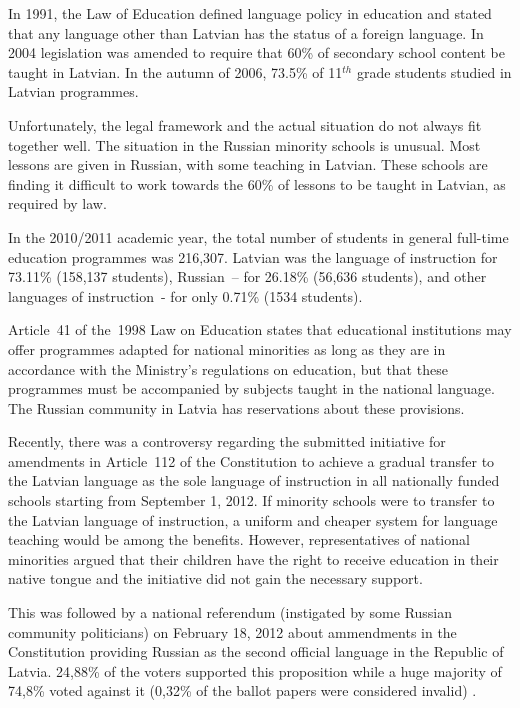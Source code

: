\begin{multicols}{2}
In 1991, the Law of Education defined language policy in education and stated that any language other than Latvian has the status of a foreign language.
In 2004 legislation was amended to require that 60\% of secondary school content be taught in Latvian.
In the autumn of 2006, 73.5\% of 11${}^{th}$ grade students studied in Latvian programmes.

Unfortunately, the legal framework and the actual situation do not always fit together well.
The situation in the Russian minority schools is unusual.
Most lessons are given in Russian, with some teaching in Latvian.
These schools are finding it difficult to work towards the 60\% of lessons to be taught in Latvian, as required by law.


In the 2010/2011 academic year, the total number of students in general full-time education programmes was 216,307.
Latvian was the language of instruction for 73.11\% (158,137 students), Russian~-- for 26.18\% (56,636 students), and other languages of instruction~- for only 0.71\% (1534 students).

Article~41 of the~1998 Law on Education states that educational institutions may offer programmes adapted for national minorities as long as they are in accordance with the Ministry's regulations on education, but that these programmes must be accompanied by subjects taught in the national language.
The Russian community in Latvia has reservations about these provisions.

Recently, there was a controversy regarding the submitted initiative for amendments in Article~112 of the Constitution to achieve a gradual transfer to the Latvian language as the sole language of instruction in all nationally funded schools starting from September 1, 2012.
If minority schools were to transfer to the Latvian language of instruction, a uniform and cheaper system for language teaching would be among the benefits.
However, representatives of national minorities argued that their children have the right to receive education in their native tongue and the initiative did not gain the necessary support.

This was followed by a national referendum (instigated by some Russian community politicians) on February 18, 2012 about ammendments in the Constitution providing Russian as the second official language in the Republic of Latvia. 
24,88\% of the voters supported this proposition while a huge majority of 74,8\% voted against it (0,32\% of the ballot papers were considered invalid) \cite{Meta56}.


\end{multicols}
